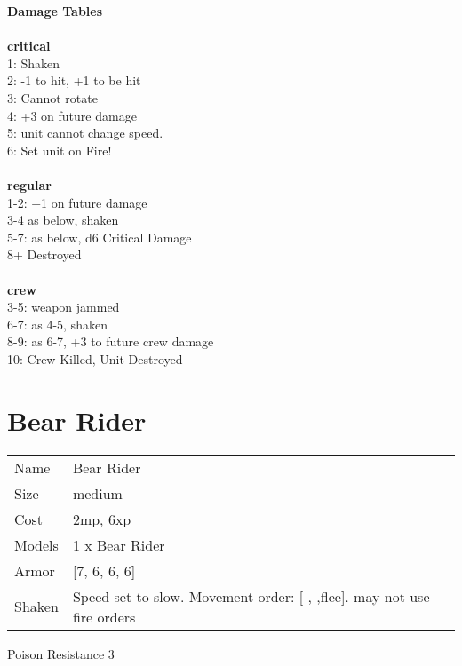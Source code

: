 {\bf Damage Tables} \\
\ \\ {\bf critical } \\
1: Shaken \\
2: -1 to hit, +1 to be hit \\
3: Cannot rotate \\
4: +3 on future damage \\
5: unit cannot change speed. \\
6: Set unit on Fire! \\
\ \\ {\bf regular } \\
1-2: +1 on future damage \\
3-4 as below, shaken \\
5-7: as below, d6 Critical Damage \\
8+ Destroyed \\
\ \\ {\bf crew } \\
3-5: weapon jammed \\
6-7: as 4-5, shaken \\
8-9: as 6-7, +3 to future crew damage \\
10: Crew Killed, Unit Destroyed \\










\pagebreak\pagebreak

\section{ Bear Rider }

\begin{tabular}{ll}
  Name & Bear Rider \\
  Size & medium\\
  Cost & 2mp, 6xp\\
  Models & 1 x Bear Rider\\
  Armor & [7, 6, 6, 6]\\
  Shaken & Speed set to slow. Movement order: [-,-,flee]. may not use fire orders\\
\end{tabular}

\noindent Poison Resistance 3\\ 



